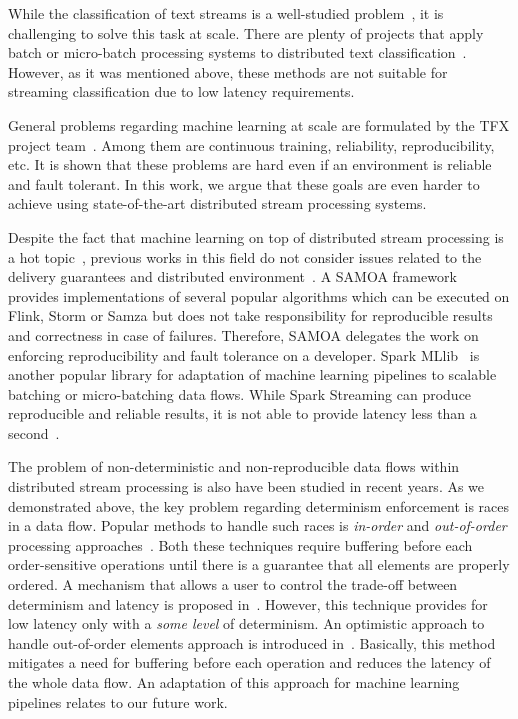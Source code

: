 \label{fs-related}

While the classification of text streams is a well-studied problem~\cite{zhang2008one, tampakas2005}, it is challenging to solve this task at scale. There are plenty of projects that apply batch or micro-batch processing systems to distributed text classification~\cite{semberecki2016distributed, 8029336, baltas2016apache, svyatkovskiy2016large}. However, as it was mentioned above, these methods are not suitable for streaming classification due to low latency requirements. 

General problems regarding machine learning at scale are formulated by the TFX project team~\cite{Baylor:2017:TTP:3097983.3098021}. Among them are continuous training, reliability, reproducibility, etc. It is shown that these problems are hard even if an environment is reliable and fault tolerant. In this work, we argue that these goals are even harder to achieve using state-of-the-art distributed stream processing systems.

Despite the fact that machine learning on top of distributed stream processing is a hot topic~\cite{qiu2016survey}, previous works in this field do not consider issues related to the delivery guarantees and distributed environment~\cite{khumoyun2016real}. A SAMOA framework~\cite{morales2015samoa} provides implementations of several popular algorithms which can be executed on Flink, Storm or Samza but does not take responsibility for reproducible results and correctness in case of failures. Therefore, SAMOA delegates the work on enforcing reproducibility and fault tolerance on a developer. Spark MLlib~\cite{meng2016mllib} is another popular library for adaptation of machine learning pipelines to scalable batching or micro-batching data flows. While Spark Streaming can produce reproducible and reliable results, it is not able to provide latency less than a second~\cite{karimov2018benchmarking, S7530084}.

The problem of non-deterministic and non-reproducible data flows within distributed stream processing is also have been studied in recent years.  As we demonstrated above, the key problem regarding determinism enforcement is races in a data flow. Popular methods to handle such races is {\em in-order} and {\em out-of-order} processing approaches~\cite{Li:2008:OPN:1453856.1453890}. Both these techniques require buffering before each order-sensitive operations until there is a guarantee that all elements are properly ordered. A mechanism that allows a user to control the trade-off between determinism and latency is proposed in~\cite{Doulkeridis:2014:SLA:2628707.2628782}. However, this technique provides for low latency only with a {\em some level} of determinism. An optimistic approach to handle out-of-order elements approach is introduced in~\cite{we2018adbis}. Basically, this method mitigates a need for buffering before each operation and reduces the latency of the whole data flow. An adaptation of this approach for machine learning pipelines relates to our future work.

